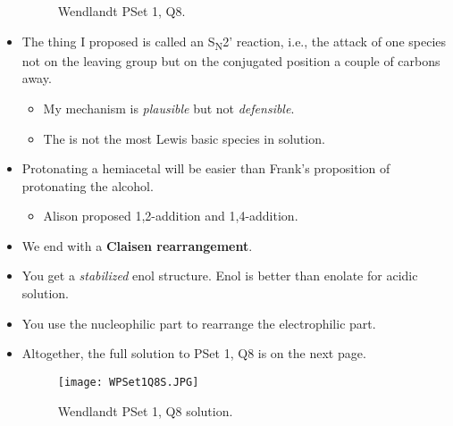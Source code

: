 \documentclass[../notes.tex]{subfiles}
\begin{document}
\begin{itemize}
\begin{figure}[h!]
        \caption{Wendlandt PSet 1, Q8.}
        \label{fig:WPSet1Q8}
    \end{figure}
    \item The thing I proposed is called an S\textsubscript{N}2' reaction, i.e., the attack of one species not on the leaving group but on the conjugated position a couple of carbons away.
    \begin{itemize}
        \item My mechanism is \emph{plausible} but not \emph{defensible}.
        \item The  is not the most Lewis basic species in solution.
    \end{itemize}
    \item Protonating a hemiacetal will be easier than Frank's proposition of protonating the alcohol.
    \begin{itemize}
        \item Alison proposed 1,2-addition and 1,4-addition.
    \end{itemize}
    \item We end with a \textbf{Claisen rearrangement}.
    \item You get a \emph{stabilized} enol structure. Enol is better than enolate for acidic solution.
    \item You use the nucleophilic part to rearrange the electrophilic part.
    \item Altogether, the full solution to PSet 1, Q8 is on the next page.
    \begin{figure}[h!]
        \centering
        \texttt{[image: WPSet1Q8S.JPG]}
        \caption{Wendlandt PSet 1, Q8 solution.}
        \label{fig:WPSet1Q8S}
    \end{figure}
\end{itemize}
\end{document}
